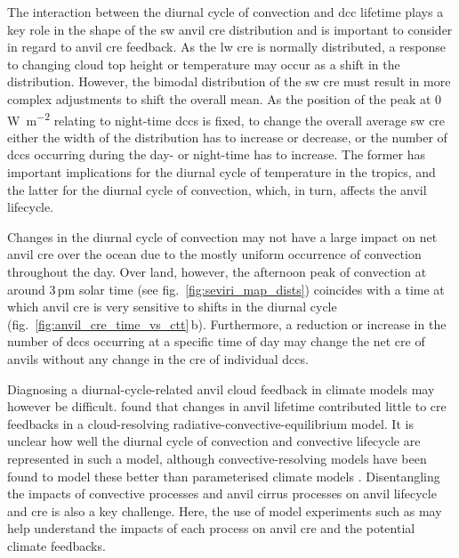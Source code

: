 The interaction between the diurnal cycle of convection and \acrshort{dcc} lifetime plays a key role in the shape of the \acrshort{sw} anvil \acrshort{cre} distribution and is important to consider in regard to anvil \acrshort{cre} feedback. 
As the \acrshort{lw} \acrshort{cre} is normally distributed, a response to changing cloud top height or temperature may occur as a shift in the distribution. 
However, the bimodal distribution of the \acrshort{sw} \acrshort{cre} must result in more complex adjustments to shift the overall mean. 
As the position of the peak at 0 \,\unit{W m^{-2}} relating to night-time \acrshort{dcc}s is fixed, to change the overall average \acrshort{sw} \acrshort{cre} either the width of the distribution has to increase or decrease, or the number of \acrshort{dcc}s occurring during the day- or night-time has to increase. 
The former has important implications for the diurnal cycle of temperature in the tropics, and the latter for the diurnal cycle of convection, which, in turn, affects the anvil lifecycle.

Changes in the diurnal cycle of convection may not have a large impact on net anvil \acrshort{cre} over the ocean due to the mostly uniform occurrence of convection throughout the day.
Over land, however, the afternoon peak of convection at around 3\,pm solar time (see fig.~\ref{fig:seviri_map_dists}) coincides with a time at which anvil \acrshort{cre} is very sensitive to shifts in the diurnal cycle (fig.~\ref{fig:anvil_cre_time_vs_ctt}\,b).
Furthermore, a reduction or increase in the number of \acrshort{dcc}s occurring at a specific time of day may change the net \acrshort{cre} of anvils without any change in the \acrshort{cre} of individual \acrshort{dcc}s.

Diagnosing a diurnal-cycle-related anvil cloud feedback in climate models may however be difficult.
\citet{beydoun_dissecting_2021} found that changes in anvil lifetime contributed little to \acrshort{cre} feedbacks in a cloud-resolving radiative-convective-equilibrium model.
It is unclear how well the diurnal cycle of convection and convective lifecycle are represented in such a model, although convective-resolving models have been found to model these better than parameterised climate models \citep{prein_review_2015, feng_mesoscale_2023}.
Disentangling the impacts of convective processes and anvil cirrus processes on anvil lifecycle and \acrshort{cre} is also a key challenge.
Here, the use of model experiments such as \citet{gasparini_diurnal_2022} may help understand the impacts of each process on anvil \acrfull{cre} and the potential climate feedbacks.

